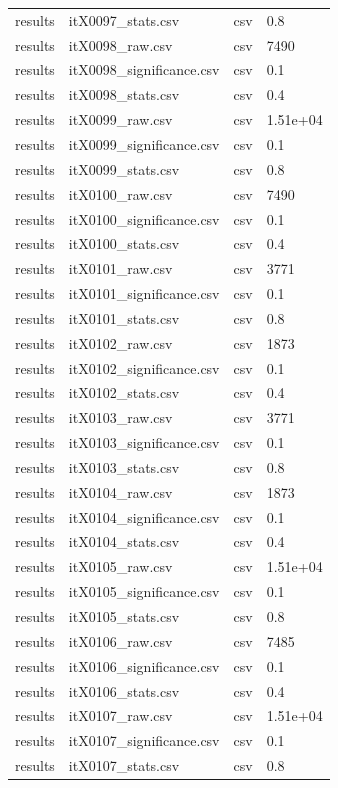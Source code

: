 \begin{landscape}
\begin{longtable}{p{}p{}p{}p{}}
results & itX0097\_stats.csv & csv & 0.8 \\
results & itX0098\_raw.csv & csv & 7490 \\
results & itX0098\_significance.csv & csv & 0.1 \\
results & itX0098\_stats.csv & csv & 0.4 \\
results & itX0099\_raw.csv & csv & 1.51e+04 \\
results & itX0099\_significance.csv & csv & 0.1 \\
results & itX0099\_stats.csv & csv & 0.8 \\
results & itX0100\_raw.csv & csv & 7490 \\
results & itX0100\_significance.csv & csv & 0.1 \\
results & itX0100\_stats.csv & csv & 0.4 \\
results & itX0101\_raw.csv & csv & 3771 \\
results & itX0101\_significance.csv & csv & 0.1 \\
results & itX0101\_stats.csv & csv & 0.8 \\
results & itX0102\_raw.csv & csv & 1873 \\
results & itX0102\_significance.csv & csv & 0.1 \\
results & itX0102\_stats.csv & csv & 0.4 \\
results & itX0103\_raw.csv & csv & 3771 \\
results & itX0103\_significance.csv & csv & 0.1 \\
results & itX0103\_stats.csv & csv & 0.8 \\
results & itX0104\_raw.csv & csv & 1873 \\
results & itX0104\_significance.csv & csv & 0.1 \\
results & itX0104\_stats.csv & csv & 0.4 \\
results & itX0105\_raw.csv & csv & 1.51e+04 \\
results & itX0105\_significance.csv & csv & 0.1 \\
results & itX0105\_stats.csv & csv & 0.8 \\
results & itX0106\_raw.csv & csv & 7485 \\
results & itX0106\_significance.csv & csv & 0.1 \\
results & itX0106\_stats.csv & csv & 0.4 \\
results & itX0107\_raw.csv & csv & 1.51e+04 \\
results & itX0107\_significance.csv & csv & 0.1 \\
results & itX0107\_stats.csv & csv & 0.8 \\

\end{longtable}
\end{landscape}
